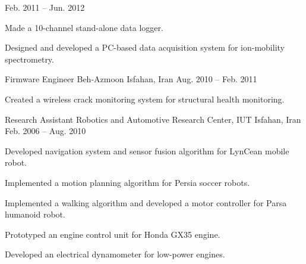 \begin{cventries}
    {Feb. 2011 -- Jun. 2012}
    {
      \begin{cvitems}
        \item Made a 10-channel stand-alone data logger.
        \item Designed and developed a PC-based data acquisition system for ion-mobility spectrometry.
      \end{cvitems}
    }
  \cventry
    {Firmware Engineer}
    {Beh-Azmoon}
    {Isfahan, Iran}
    {Aug. 2010 -- Feb. 2011}
    {
      \begin{cvitems}
        \item Created a wireless crack monitoring system for structural health monitoring. %
      \end{cvitems}
    }
  \cventry
    {Research Assistant}
    {Robotics and Automotive Research Center, IUT}
    {Isfahan, Iran}
    {Feb. 2006 -- Aug. 2010}
    {
      \begin{cvitems}
        \item Developed navigation system and sensor fusion algorithm for LynCean mobile robot.
        \item Implemented a motion planning algorithm for Persia soccer robots.
        \item Implemented a walking algorithm and developed a motor controller for Parsa humanoid robot.
        \item Prototyped an engine control unit for Honda GX35 engine.
        \item Developed an electrical dynamometer for low-power engines.
      \end{cvitems}
    }
\end{cventries} 